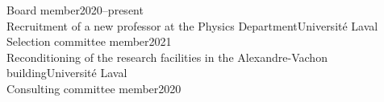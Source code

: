 \documentclass[11pt]{article}
\newcommand{\SousTitreA}[2]{{\normalsize\textbf{#1} #2 \vspace{-0.5\baselineskip}}}
\newcommand{\SousTitreB}[2]{{\vspace{0.4\baselineskip}\SousTitreA{#1}{#2}}}
\newlength{\EspaceListe}
\begin{document}
Board member\hfill 2020--present\vspace{0.75\baselineskip}\\
%
Recruitment of a new professor at the Physics Department\hfill Universit\'e Laval\\
Selection committee member\hfill 2021\vspace{0.75\baselineskip}\\
%
Reconditioning of the research facilities in the Alexandre-Vachon building\hfill Universit\'e Laval\\
Consulting committee member\hfill 2020\vspace{0.75\baselineskip}\\
%
\end{document}
